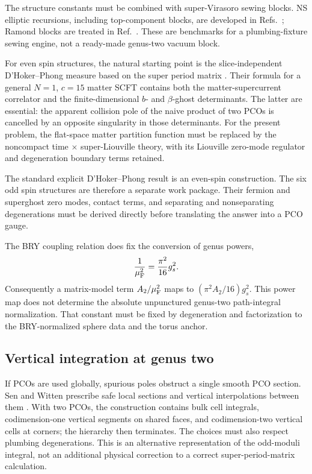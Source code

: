 \documentclass[11pt]{article}
\begin{document}
The structure constants must be combined with super-Virasoro sewing blocks.
NS elliptic recursions, including top-component blocks, are developed in
Refs.~\cite{BelavinEtAl2007Bootstrap,Belavin2007FourPoint,Suchanek2011EllipticRecursion};
Ramond blocks are treated in Ref.~\cite{HadaszJaskolskiSuchanek2008RamondBlocks}.
These are benchmarks for a plumbing-fixture sewing engine, not a ready-made
genus-two vacuum block.

For even spin structures, the natural starting point is the slice-independent
D'Hoker--Phong measure based on the super period matrix
\cite{DHokerPhong2002ChiralMeasure,DHokerPhong2002Lectures}.  Their formula
for a general $N=1$, $c=15$ matter SCFT contains both the matter-supercurrent
correlator and the finite-dimensional $b$- and $\beta$-ghost determinants.
The latter are essential: the apparent collision pole of the naive product
of two PCOs is cancelled by an opposite singularity in those determinants.
For the present problem, the flat-space matter partition function must be
replaced by the noncompact time $\times$ super-Liouville theory, with its
Liouville zero-mode regulator and degeneration boundary terms retained.

The standard explicit D'Hoker--Phong result is an even-spin construction.
The six odd spin structures are therefore a separate work package.  Their
fermion and superghost zero modes, contact terms, and separating and
nonseparating degenerations must be derived directly before translating the
answer into a PCO gauge.

The BRY coupling relation does fix the conversion of genus powers,
\begin{equation}
 \frac1{\mu_{\rm F}^2}=\frac{\pi^2}{16}g_s^2.
 \label{eq:genus-two-power-map}
\end{equation}
Consequently a matrix-model term $A_2/\mu_{\rm F}^2$ maps to
$(\pi^2A_2/16)g_s^2$.  This power map does not determine the absolute
unpunctured genus-two path-integral normalization.  That constant must be
fixed by degeneration and factorization to the BRY-normalized sphere data
and the torus anchor.

\subsection{Vertical integration at genus two}

If PCOs are used globally, spurious poles obstruct a single smooth PCO
section.  Sen and Witten prescribe safe local sections and vertical
interpolations between them
\cite{Sen2015OffShell,SenWitten2015PCO}.  With two PCOs, the construction
contains bulk cell integrals, codimension-one vertical segments on shared
faces, and codimension-two vertical cells at corners; the hierarchy then
terminates.  The choices must also respect plumbing degenerations.  This is
an alternative representation of the odd-moduli integral, not an additional
physical correction to a correct super-period-matrix calculation.
\end{document}
